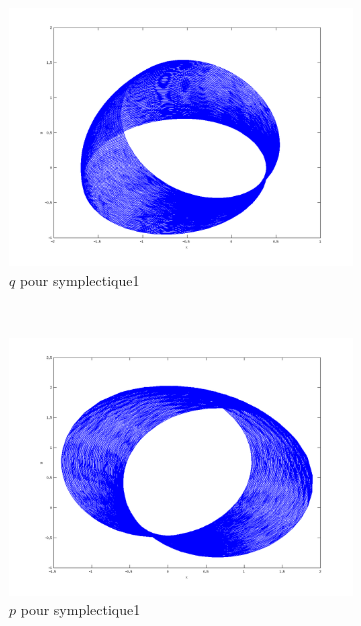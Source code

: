 \begin{figure}
  \begin{subfigure}[b]{0.3\textwidth}
    \includegraphics[width=\textwidth]{images/Q1_symplectique1_q.png}
    \caption{$q$ pour symplectique1}
    \label{fig:q1_symplectique1_q}
  \end{subfigure}%
  ~
  \begin{subfigure}[b]{0.3\textwidth}
    \includegraphics[width=\textwidth]{images/Q1_symplectique1_p.png}
    \caption{$p$ pour symplectique1}
    \label{fig:q1_symplectique1_p}
  \end{subfigure}
  ~
  \begin{subfigure}[b]{0.3\textwidth}

\end{subfigure}
\end{figure}
